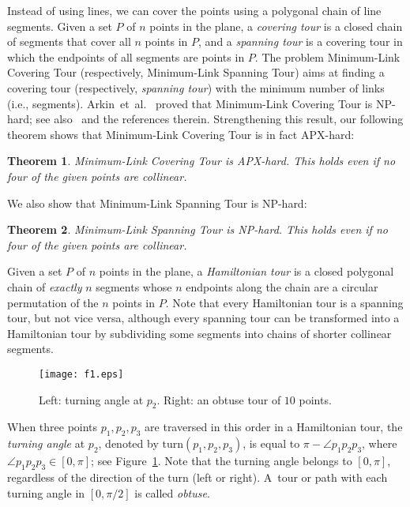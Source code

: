 \documentclass[letterpaper,11pt]{article}
\newtheorem{theorem}{Theorem}
\def\etal{{et~al.}}
\def\ie{{i.e.}}
\begin{document}
Instead of using lines,
we can cover the points using a polygonal chain of line segments.
Given a set $P$ of $n$ points in the plane,
a \emph{covering tour} is a closed chain of segments
that cover all $n$ points in $P$,
and a \emph{spanning tour} is a covering tour in which
the endpoints of all segments are points in $P$.
The problem {\sc Minimum-Link Covering Tour}
(respectively,
{\sc Minimum-Link Spanning Tour})
aims at finding a covering tour
(respectively,
\emph{spanning tour})
with the minimum number of links (\ie, segments).
Arkin~\etal~\cite{AMP03} proved that {\sc Minimum-Link Covering Tour}
is NP-hard; see also~\cite{ABDFMS05,Ji12} and the references therein.
Strengthening this result, our following theorem shows that
{\sc Minimum-Link Covering Tour} is in fact APX-hard:

\begin{theorem}\label{thm:covering}
{\sc Minimum-Link Covering Tour} is APX-hard.
This holds even if no four of the given points are collinear.
\end{theorem}

We also show that {\sc Minimum-Link Spanning Tour} is NP-hard:

\begin{theorem}\label{thm:spanning}
{\sc Minimum-Link Spanning Tour} is NP-hard.
This holds even if no four of the given points are collinear.
\end{theorem}

Given a set $P$ of $n$ points in the plane,
a \emph{Hamiltonian tour} is a closed polygonal chain of
\emph{exactly} $n$ segments whose $n$ endpoints along the chain are
a circular permutation of the $n$ points in $P$.
Note that every Hamiltonian tour is a spanning tour, but not vice versa,
although every spanning tour can be transformed into a Hamiltonian tour
by subdividing some segments into chains of shorter collinear segments.
\begin{figure}[htb]
\centering\texttt{[image: f1.eps]}
\caption{Left: turning angle at $p_2$.
Right: an obtuse tour of $10$ points.}
\label{fig:f1}
\end{figure}

When three points $p_1,p_2,p_3$ are traversed in this order in a
Hamiltonian tour, 
the \emph{turning angle} at $p_2$, denoted by $\mathrm{turn}(p_1,p_2,p_3)$,
is equal to $\pi - \angle p_1p_2p_3$, where $\angle p_1p_2p_3 \in [0,\pi]$;
see Figure~\ref{fig:f1}. Note that the turning angle belongs to $[0,\pi]$, 
regardless of the direction of the turn (left or right). 
A~tour or path with each turning angle in $[0,\pi/2]$ is called \emph{obtuse}.
\end{document}
